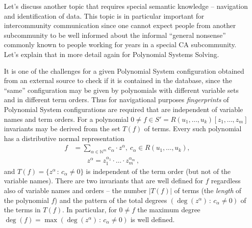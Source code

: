 \documentclass[a4paper,11pt]{article}
\begin{document}
\begin{multicols}{2}
Let's discuss another topic that requires special semantic knowledge --
navigation and identification of data. This topic is in particular important
for intercommunity communication since one cannot expect people from another
subcommunity to be well informed about the informal ``general nonsense''
commonly known to people working for years in a special CA subcommunity.  Let's
explain that in more detail again for Polynomial Systems Solving.

It is one of the challenges for a given Polynomial System configuration
obtained from an external source to check if it is contained in the database,
since the ``same'' configuration may be given by polynomials with different
variable sets and in different term orders. Thus for navigational purposes
\emph{fingerprints} of Polynomial System configurations are required that are
independent of variable names and term orders. For a polynomial $0\neq f\in
S'=R(u_1,\dots,u_k)[z_1,\dots,z_m]$ invariants may be derived from the set
$T(f)$ of terms. Every such polynomial has a distributive normal representation
\begin{align*}
  f&=\sum_{\alpha\in\mathbb{N}^m}{c_\alpha\cdot z^\alpha},\ c_\alpha\in
  R(u_1,\dots,u_k),\\ & \qquad z^\alpha=z_1^{\alpha_1}\cdot\ldots\cdot
  z_m^{\alpha_m}\,,
\end{align*}
and $T(f)=\{z^\alpha\,:\,c_\alpha\neq 0\}$ is independent of the term order
(but not of the variable names).  There are two invariants that are well
defined for $f$ regardless also of variable names and orders -- the number
$|T(f)|$ of terms (the \emph{length} of the polynomial $f$) and the pattern of
the total degrees $(\deg(z^\alpha)\,:\,c_\alpha\neq 0)$ of the terms in
$T(f)$.  In particular, for $0\neq f$ the maximum degree
$\deg(f)=\max(\deg(z^\alpha)\,:\,c_\alpha\neq 0)$ is well defined.  


\end{multicols}
\end{document}
